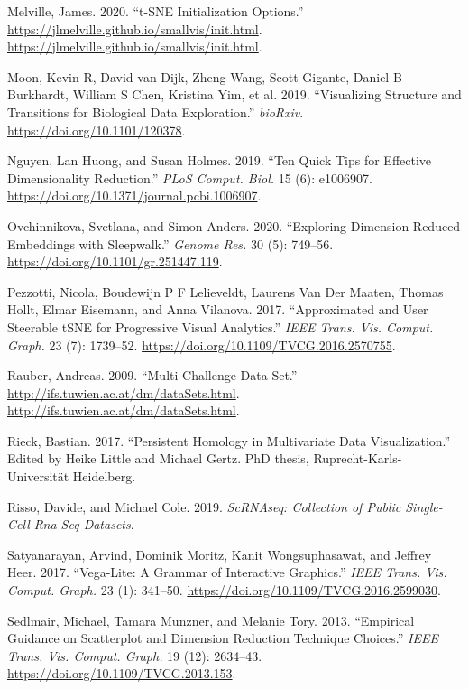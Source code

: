 \documentclass[article,notitle]{jdssv}
\begin{document}
\leavevmode\hypertarget{ref-Melville2020}{}%
Melville, James. 2020. ``t-SNE Initialization Options.'' \url{https://jlmelville.github.io/smallvis/init.html}. \url{https://jlmelville.github.io/smallvis/init.html}.

\leavevmode\hypertarget{ref-Moon2019-ce}{}%
Moon, Kevin R, David van Dijk, Zheng Wang, Scott Gigante, Daniel B Burkhardt, William S Chen, Kristina Yim, et al. 2019. ``Visualizing Structure and Transitions for Biological Data Exploration.'' \emph{bioRxiv}. \url{https://doi.org/10.1101/120378}.

\leavevmode\hypertarget{ref-Nguyen2019-yh}{}%
Nguyen, Lan Huong, and Susan Holmes. 2019. ``Ten Quick Tips for Effective Dimensionality Reduction.'' \emph{PLoS Comput. Biol.} 15 (6): e1006907. \url{https://doi.org/10.1371/journal.pcbi.1006907}.

\leavevmode\hypertarget{ref-Ovchinnikova2020-sy}{}%
Ovchinnikova, Svetlana, and Simon Anders. 2020. ``Exploring Dimension-Reduced Embeddings with Sleepwalk.'' \emph{Genome Res.} 30 (5): 749--56. \url{https://doi.org/10.1101/gr.251447.119}.

\leavevmode\hypertarget{ref-Pezzotti2017-cz}{}%
Pezzotti, Nicola, Boudewijn P F Lelieveldt, Laurens Van Der Maaten, Thomas Hollt, Elmar Eisemann, and Anna Vilanova. 2017. ``Approximated and User Steerable tSNE for Progressive Visual Analytics.'' \emph{IEEE Trans. Vis. Comput. Graph.} 23 (7): 1739--52. \url{https://doi.org/10.1109/TVCG.2016.2570755}.

\leavevmode\hypertarget{ref-Rauber2009-vh}{}%
Rauber, Andreas. 2009. ``Multi-Challenge Data Set.'' \url{http://ifs.tuwien.ac.at/dm/dataSets.html}. \url{http://ifs.tuwien.ac.at/dm/dataSets.html}.

\leavevmode\hypertarget{ref-Rieck2017-kk}{}%
Rieck, Bastian. 2017. ``Persistent Homology in Multivariate Data Visualization.'' Edited by Heike Little and Michael Gertz. PhD thesis, Ruprecht-Karls-Universität Heidelberg.

\leavevmode\hypertarget{ref-scRNAseq-d}{}%
Risso, Davide, and Michael Cole. 2019. \emph{ScRNAseq: Collection of Public Single-Cell Rna-Seq Datasets}.

\leavevmode\hypertarget{ref-Satyanarayan2017-gs}{}%
Satyanarayan, Arvind, Dominik Moritz, Kanit Wongsuphasawat, and Jeffrey Heer. 2017. ``Vega-Lite: A Grammar of Interactive Graphics.'' \emph{IEEE Trans. Vis. Comput. Graph.} 23 (1): 341--50. \url{https://doi.org/10.1109/TVCG.2016.2599030}.

\leavevmode\hypertarget{ref-Sedlmair2013-pn}{}%
Sedlmair, Michael, Tamara Munzner, and Melanie Tory. 2013. ``Empirical Guidance on Scatterplot and Dimension Reduction Technique Choices.'' \emph{IEEE Trans. Vis. Comput. Graph.} 19 (12): 2634--43. \url{https://doi.org/10.1109/TVCG.2013.153}.
\end{document}
